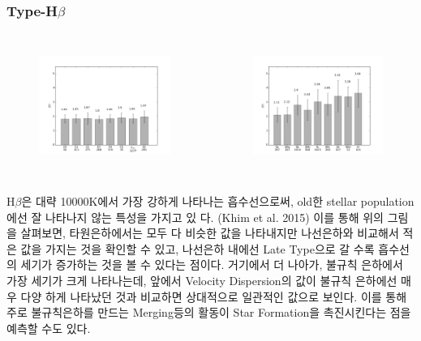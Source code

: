 \documentclass[xcolor={dvipsnames,table}]{beamer}
\newcommand\SSM{\fontsize{7}{7.2}\selectfont}
\begin{document}
\begin{frame}
 \frametitle{Type-H$\beta$}
 \SSM
  \begin{columns}[t]
   \begin{figure}
    \centering
    \includegraphics[width=6cm, height=4cm]{elhb.png}
   \end{figure}
   \begin{figure}
    \centering
    \includegraphics[width=6cm, height=4cm]{sphb.png}
   \end{figure}
  \end{columns}
\vspace{0.2cm}
H$\beta$은 대략 10000K에서 가장 강하게 나타나는 흡수선으로써, old한 stellar population에선 잘 나타나지 않는 특성을 가지고 있
다. (Khim et al. 2015) 이를 통해 위의 그림을 살펴보면, 타원은하에서는 모두 다 비슷한 값을 나타내지만 나선은하와 비교해서 적
은 값을 가지는 것을 확인할 수 있고, 나선은하 내에선 Late Type으로 갈 수록 흡수선의 세기가 증가하는 것을 볼 수 있다는 점이다.
거기에서 더 나아가, 불규칙 은하에서 가장 세기가 크게 나타나는데, 앞에서 Velocity Dispersion의 값이 불규칙 은하에선 매우 다양
하게 나타났던 것과 비교하면 상대적으로 일관적인 값으로 보인다. 이를 통해 주로 불규칙은하를 만드는 Merging등의 활동이 Star
Formation을 촉진시킨다는 점을 예측할 수도 있다.
\end{frame}
\end{document}
